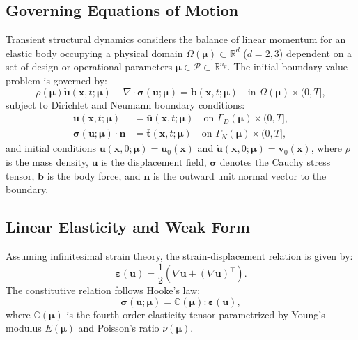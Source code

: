 \subsection{Governing Equations of Motion}
\label{subsec:governing_eqs}
Transient structural dynamics considers the balance of linear momentum for an elastic body occupying a physical domain $\Omega(\bm{\mu}) \subset \mathbb{R}^d$ ($d=2,3$) dependent on a set of design or operational parameters $\bm{\mu} \in \mathcal{P} \subset \mathbb{R}^{n_p}$. The initial-boundary value problem is governed by:
\begin{equation}
    \rho(\bm{\mu}) \ddot{\bm{u}}(\bm{x}, t; \bm{\mu}) - \nabla \cdot \bm{\sigma}(\bm{u}; \bm{\mu}) = \bm{b}(\bm{x}, t; \bm{\mu}) \quad \text{in } \Omega(\bm{\mu}) \times (0, T],
    \label{eq:momentum_balance}
\end{equation}
subject to Dirichlet and Neumann boundary conditions:
\begin{align}
    \bm{u}(\bm{x}, t; \bm{\mu}) &= \bar{\bm{u}}(\bm{x}, t; \bm{\mu}) \quad \text{on } \Gamma_D(\bm{\mu}) \times (0, T], \\
    \bm{\sigma}(\bm{u}; \bm{\mu}) \cdot \bm{n} &= \bar{\bm{t}}(\bm{x}, t; \bm{\mu}) \quad \text{on } \Gamma_N(\bm{\mu}) \times (0, T],
\end{align}
and initial conditions $\bm{u}(\bm{x}, 0; \bm{\mu}) = \bm{u}_0(\bm{x})$ and $\dot{\bm{u}}(\bm{x}, 0; \bm{\mu}) = \bm{v}_0(\bm{x})$, where $\rho$ is the mass density, $\bm{u}$ is the displacement field, $\bm{\sigma}$ denotes the Cauchy stress tensor, $\bm{b}$ is the body force, and $\bm{n}$ is the outward unit normal vector to the boundary.

\subsection{Linear Elasticity and Weak Form}
\label{subsec:weak_form}
Assuming infinitesimal strain theory, the strain-displacement relation is given by:
\begin{equation}
    \bm{\varepsilon}(\bm{u}) = \frac{1}{2} \left( \nabla \bm{u} + (\nabla \bm{u})^\top \right).
\end{equation}
The constitutive relation follows Hooke's law:
\begin{equation}
    \bm{\sigma}(\bm{u}; \bm{\mu}) = \mathbb{C}(\bm{\mu}) : \bm{\varepsilon}(\bm{u}),
\end{equation}
where $\mathbb{C}(\bm{\mu})$ is the fourth-order elasticity tensor parametrized by Young's modulus $E(\bm{\mu})$ and Poisson's ratio $\nu(\bm{\mu})$.

